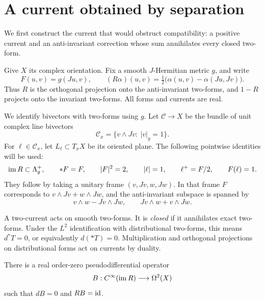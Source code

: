 \section{A current obtained by separation}\label{sec:currents}

We first construct the current that would obstruct compatibility:
a positive current and an anti-invariant correction whose sum
annihilates every closed two-form.

Give \(X\) its complex orientation. Fix a smooth \(J\)-Hermitian
metric \(g\), and write
\[
F(u,v)=g(Ju,v),\qquad
(R\alpha)(u,v)=\tfrac12\bigl(\alpha(u,v)-\alpha(Ju,Jv)\bigr).
\]
Thus \(R\) is the orthogonal projection onto the anti-invariant
two-forms, and \(1-R\) projects onto the invariant two-forms.
All forms and currents are real.

We identify bivectors with two-forms using \(g\). Let
\(\mathscr C\to X\) be the bundle of unit complex line bivectors
\[
\mathscr C_x=\{v\wedge Jv:\ |v|_g=1\}.
\]
For \(\ell\in\mathscr C_x\), let \(L_\ell\subset T_xX\) be its
oriented plane. The following pointwise identities will be used:
\begin{equation}\label{eq:algebra}
\operatorname{im} R\subset\Lambda_g^+,\qquad
*F=F,\qquad |F|^2=2,\qquad
|\ell|=1,\qquad \ell^+=F/2,\qquad F(\ell)=1.
\end{equation}
They follow by taking a unitary frame
\((v,Jv,w,Jw)\). In that frame \(F\) corresponds to
\(v\wedge Jv+w\wedge Jw\), and the anti-invariant subspace is spanned
by
\[
v\wedge w-Jv\wedge Jw,\qquad
Jv\wedge w+v\wedge Jw.
\]

A two-current acts on smooth two-forms. It is \emph{closed} if it
annihilates exact two-forms. Under the \(L^2\) identification with
distributional two-forms, this means \(d^*T=0\), or equivalently
\(d(*T)=0\). Multiplication and orthogonal projections on
distributional forms act on currents by duality.

\begin{lemma}\label{lem:lift}
There is a real order-zero pseudodifferential operator
\[
B:C^\infty(\operatorname{im} R)\longrightarrow\Omega^2(X)
\]
such that \(dB=0\) and \(RB=\mathrm{id}\).
\end{lemma}

